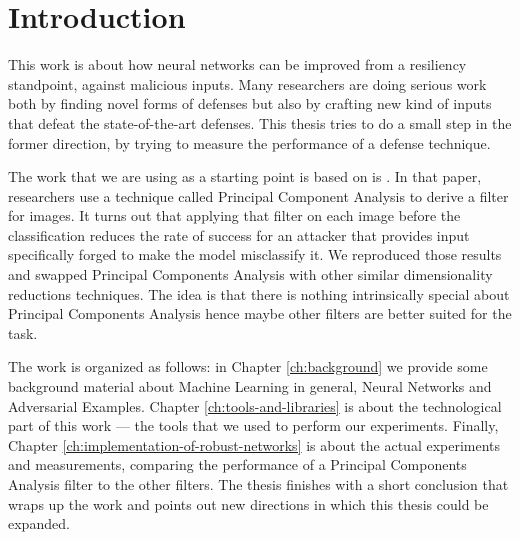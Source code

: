 \chapter*{Introduction}

This work is about how neural networks can be improved from a
resiliency standpoint, against malicious inputs. Many researchers are
doing serious work \cite{papernot2016cleverhans}
\cite{DBLP:journals/corr/KurakinGB16} \cite{carlini2017adversarial}
\cite{meng2017magnet} \cite{yuan2017adversarial} \cite{xu2017feature}
\cite{liao2018defense} both by finding novel forms of defenses but also
by crafting new kind of inputs that defeat the state-of-the-art
defenses. This thesis tries to do a small step in the former direction,
by trying to measure the performance of a defense technique.

The work that we are using as a starting point is based on is
\cite{bhagoji2018enhancing}. In that paper, researchers use a technique
called Principal Component Analysis to derive a filter for images. It
turns out that applying that filter on each image before the
classification reduces the rate of success for an attacker that
provides input specifically forged to make the model misclassify it. We
reproduced those results and swapped Principal Components Analysis with
other similar dimensionality reductions techniques. The idea is that
there is nothing intrinsically special about Principal Components
Analysis hence maybe other filters are better suited for the task.

The work is organized as follows: in Chapter \ref{ch:background} we
provide some background material about Machine Learning in general,
Neural Networks and Adversarial Examples. Chapter
\ref{ch:tools-and-libraries} is about the technological part of this
work --- the tools that we used to perform our experiments. Finally,
Chapter \ref{ch:implementation-of-robust-networks} is about the actual
experiments and measurements, comparing the performance of a Principal
Components Analysis filter to the other filters. The thesis finishes
with a short conclusion that wraps up the work and points out new
directions in which this thesis could be expanded.
